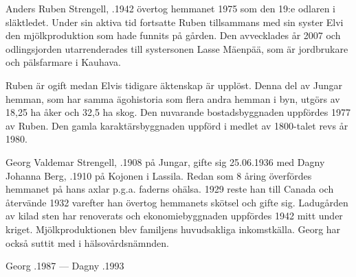 Anders Ruben Strengell, .1942 övertog hemmanet 1975 som den 19:e odlaren i släktledet. Under sin aktiva tid fortsatte Ruben tillsammans med sin syster Elvi den mjölkproduktion som hade funnits på gården. Den avvecklades år 2007 och odlingsjorden utarrenderades till systersonen Lasse Mäenpää, som är jordbrukare och pälsfarmare i Kauhava.

Ruben är ogift medan Elvis tidigare äktenskap är upplöst. Denna del av Jungar hemman, som har samma ägohistoria som flera andra hemman i byn, utgörs av 18,25 ha åker och 32,5 ha skog. Den nuvarande bostadsbyggnaden uppfördes 1977 av Ruben. Den gamla karaktärsbyggnaden uppförd i medlet av 1800-talet revs år 1980.





Georg Valdemar Strengell, .1908 på Jungar, gifte sig 25.06.1936 med Dagny Johanna Berg, .1910 på Kojonen i Lassila. Redan som 8 åring överfördes hemmanet på hans axlar p.g.a. faderns ohälsa. 1929 reste han till Canada och återvände 1932 varefter han övertog hemmanets skötsel och gifte sig. Ladugården av kilad sten har renoverats och ekonomiebyggnaden uppfördes 1942 mitt under kriget. Mjölkproduktionen blev familjens huvudsakliga inkomstkälla. Georg har också suttit med i hälsovårdsnämnden.
\begin{jhchildren}
  \item {}
  \item {}
  \item {}
  \item {}
\end{jhchildren}

Georg .1987  ---  Dagny .1993


